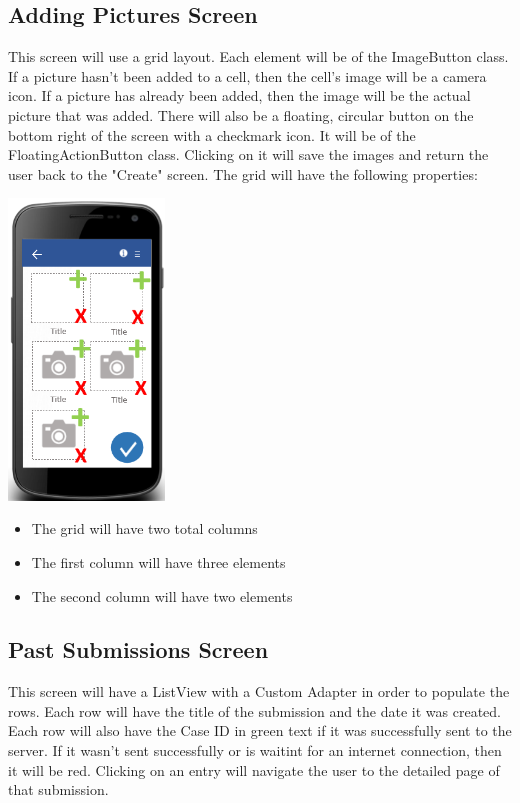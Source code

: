\documentclass[onecolumn, draftclsnofoot,10pt, compsoc]{IEEEtran}
\begin{document}
\subsection{Adding Pictures Screen}
This screen will use a grid layout. Each element will be of the ImageButton class. If a picture hasn't been added to a cell, then the cell's image will be a camera icon. If a picture has already been added, then the image will be the actual picture that was added. There will also be a floating, circular button on the bottom right of the screen with a checkmark icon. It will be of the FloatingActionButton class. Clicking on it will save the images and return the user back to the "Create" screen. The grid will have the following properties:
\newline
\begin{center}
\includegraphics[height=8cm]{picturesscreen.png}
\end{center}

\begin{itemize}
\item The grid will have two total columns
\item The first column will have three elements
\item The second column will have two elements
\end{itemize}

\subsection{Past Submissions Screen}
This screen will have a ListView with a Custom Adapter in order to populate the rows. Each row will have the title of the submission and the date it was created. Each row will also have the Case ID in green text if it was successfully sent to the server. If it wasn't sent successfully or is waitint for an internet connection, then it will be red. Clicking on an entry will navigate the user to the detailed page of that submission.
\end{document}
